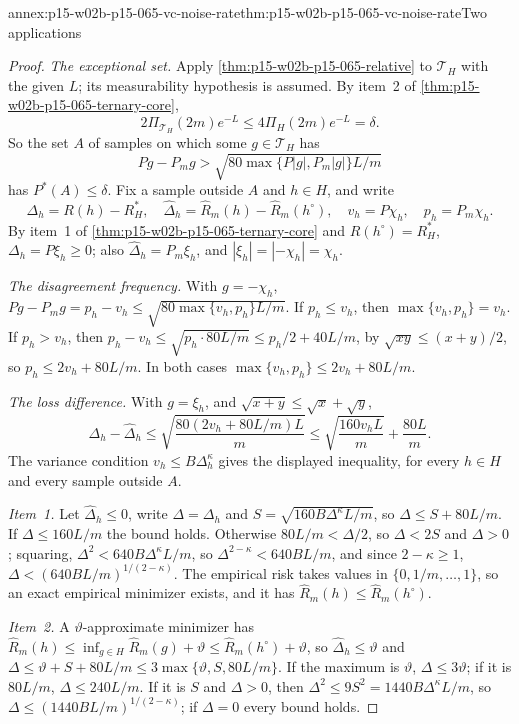 \begin{annexitem}{annex:p15-w02b-p15-065-vc-noise-rate}{thm:p15-w02b-p15-065-vc-noise-rate}{Two applications}
\begin{proof}
\emph{The exceptional set.} Apply
\cref{thm:p15-w02b-p15-065-relative} to \(\mathcal T_H\) with the given
\(L\); its measurability hypothesis is assumed. By item~2 of
\cref{thm:p15-w02b-p15-065-ternary-core},
\[
 2\Pi_{\mathcal T_H}(2m)e^{-L}\leq4\Pi_H(2m)e^{-L}=\delta .
\]
So the set \(A\) of samples on which some \(g\in\mathcal T_H\) has
\[
 Pg-P_mg>\sqrt{80\max\{P|g|,P_m|g|\}L/m}
\]
has \(P^{*}(A)\leq\delta\).
Fix a sample outside \(A\) and \(h\in H\), and write
\[
 \Delta_h=R(h)-R_H^{*},\quad \widehat\Delta_h=\widehat R_m(h)-\widehat R_m(h^{\circ}),\quad
 v_h=P\chi_h,\quad p_h=P_m\chi_h .
\]
By item~1 of \cref{thm:p15-w02b-p15-065-ternary-core} and
\(R(h^{\circ})=R_H^{*}\), \(\Delta_h=P\xi_h\geq0\); also
\(\widehat\Delta_h=P_m\xi_h\), and \(|\xi_h|=|-\chi_h|=\chi_h\).

\emph{The disagreement frequency.} With \(g=-\chi_h\),
\(Pg-P_mg=p_h-v_h\leq\sqrt{80\max\{v_h,p_h\}L/m}\). If \(p_h\leq v_h\),
then \(\max\{v_h,p_h\}=v_h\). If \(p_h>v_h\), then
\(p_h-v_h\leq\sqrt{p_h\cdot80L/m}\leq p_h/2+40L/m\), by
\(\sqrt{xy}\leq(x+y)/2\), so \(p_h\leq2v_h+80L/m\). In both cases
\(\max\{v_h,p_h\}\leq2v_h+80L/m\).

\emph{The loss difference.} With \(g=\xi_h\), and
\(\sqrt{x+y}\leq\sqrt x+\sqrt y\),
\[
 \Delta_h-\widehat\Delta_h\leq\sqrt{\frac{80(2v_h+80L/m)L}m}
 \leq\sqrt{\frac{160v_hL}m}+\frac{80L}m .
\]
The variance condition \(v_h\leq B\Delta_h^{\kappa}\) gives the displayed
inequality, for every \(h\in H\) and every sample outside \(A\).

\emph{Item~1.} Let \(\widehat\Delta_h\leq0\), write \(\Delta=\Delta_h\) and
\(S=\sqrt{160B\Delta^{\kappa}L/m}\), so \(\Delta\leq S+80L/m\). If
\(\Delta\leq160L/m\) the bound holds. Otherwise \(80L/m<\Delta/2\), so
\(\Delta<2S\) and \(\Delta>0\); squaring,
\(\Delta^2<640B\Delta^{\kappa}L/m\), so \(\Delta^{2-\kappa}<640BL/m\), and
since \(2-\kappa\geq1\), \(\Delta<(640BL/m)^{1/(2-\kappa)}\). The
empirical risk takes values in \(\{0,1/m,\ldots,1\}\), so an exact
empirical minimizer exists, and it has
\(\widehat R_m(h)\leq\widehat R_m(h^{\circ})\).

\emph{Item~2.} A \(\vartheta\)-approximate minimizer has
\(\widehat R_m(h)\leq\inf_{g\in H}\widehat R_m(g)+\vartheta\leq
\widehat R_m(h^{\circ})+\vartheta\), so \(\widehat\Delta_h\leq\vartheta\) and
\(\Delta\leq\vartheta+S+80L/m\leq3\max\{\vartheta,S,80L/m\}\). If the
maximum is \(\vartheta\), \(\Delta\leq3\vartheta\); if it is \(80L/m\),
\(\Delta\leq240L/m\). If it is \(S\) and \(\Delta>0\), then
\(\Delta^2\leq9S^2=1440B\Delta^{\kappa}L/m\), so
\(\Delta\leq(1440BL/m)^{1/(2-\kappa)}\); if \(\Delta=0\) every bound holds.


\end{proof}
\end{annexitem}
